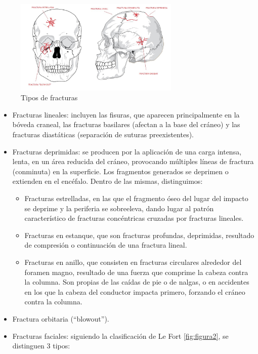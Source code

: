 \begin{figure}
	\centering
	\includegraphics[width=0.7\textwidth]{imagenes/Figura1}
	\caption{Tipos de fracturas}
	\label{fig:figura1}
\end{figure}

\begin{itemize}
	\item Fracturas lineales: incluyen las fisuras, que aparecen principalmente en la bóveda craneal, las fracturas basilares (afectan a la base del cráneo) y las fracturas diastáticas (separación de suturas preexistentes). 
	\item Fracturas deprimidas: se producen por la aplicación de una carga intensa, lenta, en un área reducida del cráneo, provocando múltiples líneas de fractura (conminuta) en la superficie. Los fragmentos generados se deprimen o extienden en el encéfalo.  Dentro de las mismas, distinguimos: 
	\begin{itemize}
		\item Fracturas estrelladas, en las que el fragmento óseo del lugar del impacto se deprime y la periferia se sobreeleva, dando lugar al patrón característico de fracturas concéntricas cruzadas por fracturas lineales.
		\item Fracturas en estanque, que son fracturas profundas, deprimidas, resultado de compresión o continuación de una fractura lineal.
		\item Fracturas en anillo, que consisten en fracturas circulares alrededor del foramen magno, resultado de una fuerza que comprime la cabeza contra la columna. Son propias de las caídas de pie o de nalgas, o en accidentes en los que la cabeza del conductor impacta primero, forzando el cráneo contra la columna. 
		\end{itemize}
	\item Fractura orbitaria (“blowout”).
	\item Fracturas faciales: siguiendo la clasificación de Le Fort \ref{fig:figura2}, se distinguen 3 tipos:
	\begin{itemize}

\end{itemize}
\end{itemize}
